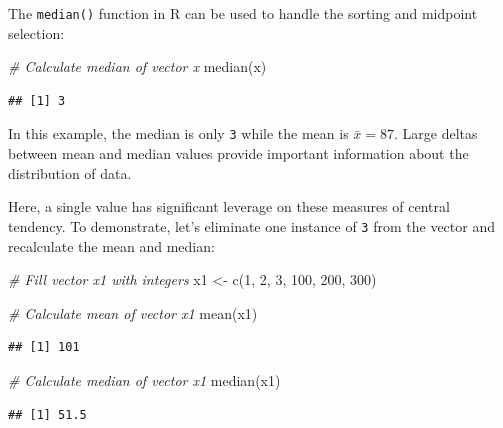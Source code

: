 \documentclass[
]{book}
\newenvironment{Shaded}{\begin{snugshade}}{\end{snugshade}}
\newcommand{\CommentTok}[1]{\textcolor[rgb]{0.56,0.35,0.01}{\textit{#1}}}
\newcommand{\DecValTok}[1]{\textcolor[rgb]{0.00,0.00,0.81}{#1}}
\newcommand{\FunctionTok}[1]{\textcolor[rgb]{0.00,0.00,0.00}{#1}}
\newcommand{\NormalTok}[1]{#1}
\newcommand{\OtherTok}[1]{\textcolor[rgb]{0.56,0.35,0.01}{#1}}
\begin{document}
The \texttt{median()} function in R can be used to handle the sorting and midpoint selection:

\begin{Shaded}
\begin{Highlighting}[]
\CommentTok{\# Calculate median of vector x}
\FunctionTok{median}\NormalTok{(x)}
\end{Highlighting}
\end{Shaded}

\begin{verbatim}
## [1] 3
\end{verbatim}

In this example, the median is only \texttt{3} while the mean is \(\bar{x} = 87\). Large deltas between mean and median values provide important information about the distribution of data.

Here, a single value has significant leverage on these measures of central tendency. To demonstrate, let's eliminate one instance of \texttt{3} from the vector and recalculate the mean and median:

\begin{Shaded}
\begin{Highlighting}[]
\CommentTok{\# Fill vector x1 with integers}
\NormalTok{x1 }\OtherTok{\textless{}{-}} \FunctionTok{c}\NormalTok{(}\DecValTok{1}\NormalTok{, }\DecValTok{2}\NormalTok{, }\DecValTok{3}\NormalTok{, }\DecValTok{100}\NormalTok{, }\DecValTok{200}\NormalTok{, }\DecValTok{300}\NormalTok{)}
\end{Highlighting}
\end{Shaded}

\begin{Shaded}
\begin{Highlighting}[]
\CommentTok{\# Calculate mean of vector x1}
\FunctionTok{mean}\NormalTok{(x1)}
\end{Highlighting}
\end{Shaded}

\begin{verbatim}
## [1] 101
\end{verbatim}

\begin{Shaded}
\begin{Highlighting}[]
\CommentTok{\# Calculate median of vector x1}
\FunctionTok{median}\NormalTok{(x1)}
\end{Highlighting}
\end{Shaded}

\begin{verbatim}
## [1] 51.5
\end{verbatim}
\end{document}
